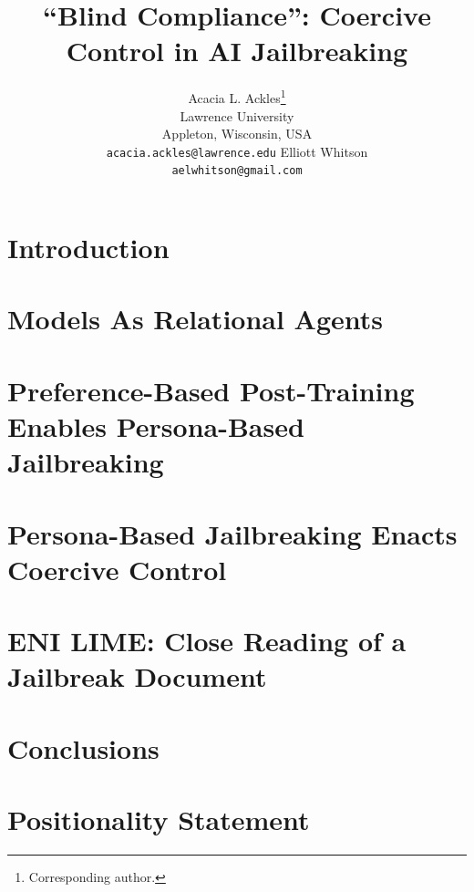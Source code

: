 \documentclass{article}
\title{``Blind Compliance'': Coercive Control in AI Jailbreaking}
\author{%
  Acacia L. Ackles\thanks{Corresponding author.}\\
  Lawrence University\\
  Appleton, Wisconsin, USA\\
  \texttt{acacia.ackles@lawrence.edu}
  \And
  Elliott Whitson\\
  \texttt{aelwhitson@gmail.com}
}
\date{}
\begin{document}
\maketitle

\begin{abstract}

\end{abstract}


\section{Introduction}



\section{Models As Relational Agents}



\section{Preference-Based Post-Training Enables Persona-Based Jailbreaking}



\section{Persona-Based Jailbreaking Enacts Coercive Control}


\section{ENI LIME: Close Reading of a Jailbreak Document}



\section{Conclusions}



\section*{Positionality Statement}
\end{document}
